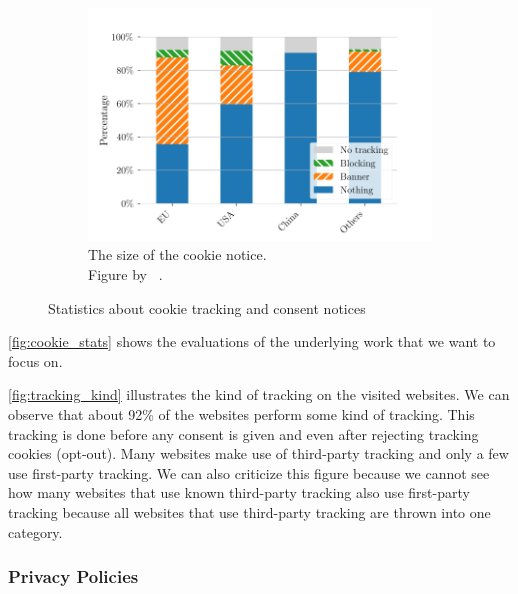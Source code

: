 \begin{figure}
    \begin{subfigure}[b]{.5\textwidth}
        \centering
        \includegraphics[width=\textwidth, scale=0.35]{figures/cookie_notice_size_trans.png}
        \caption{The size of the cookie notice.\\Figure by \citeauthor{sanchez2019can}~\cite[Fig.~2a]{sanchez2019can}.}
        \label{fig:notice_size}
    \end{subfigure}
    \caption{Statistics about cookie tracking and consent notices}
    \label{fig:cookie_stats}
\end{figure}

\autoref{fig:cookie_stats} shows the evaluations of the underlying work that we want to focus on.

\autoref{fig:tracking_kind} illustrates the kind of tracking on the visited websites. We can observe that about 92\% of
the websites perform some kind of tracking. This tracking is done before any consent is given and even after rejecting
tracking cookies (opt-out). Many websites make use of third-party tracking and only a few use first-party tracking. We
can also criticize this figure because we cannot see how many websites that use known third-party tracking also use
first-party tracking because all websites that use third-party tracking are thrown into one category.


\subsubsection{Privacy Policies}

